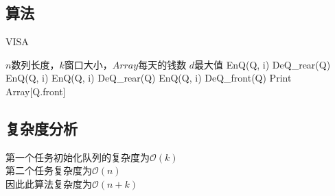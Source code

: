 \documentclass[UTF8]{ctexart}
\begin{document}
\subsection{算法}
\renewcommand{\algorithmicrequire}{\textbf{输入:}}
\renewcommand{\algorithmicensure}{\textbf{输出:}}
\begin{algorithm}
	\caption{VISA}
	\begin{algorithmic}[1]
	\Require $n$数列长度，$k$窗口大小，$Array$每天的钱数
	\Ensure  $d$最大值
			\State EnQ(Q, i)
		\Else
				\State DeQ\_rear(Q)
			\EndWhile
			\State EnQ(Q, i)
		\EndIf
	\EndFor
				\State EnQ(Q, i)
			\Else
					\State DeQ\_rear(Q)
				\EndWhile
				\State EnQ(Q, i)
			\EndIf
		\EndIf
		\State DeQ\_front(Q)
	\EndWhile
	\State Print Array[Q.front]
	\EndFor
	\end{algorithmic}
\end{algorithm}
\subsection{复杂度分析}
第一个任务初始化队列的复杂度为{$\mathcal{O}(k)$}\\
第二个任务复杂度为{$\mathcal{O}(n)$}\\
因此此算法复杂度为{$\mathcal{O}(n+k)$}
\end{document}
